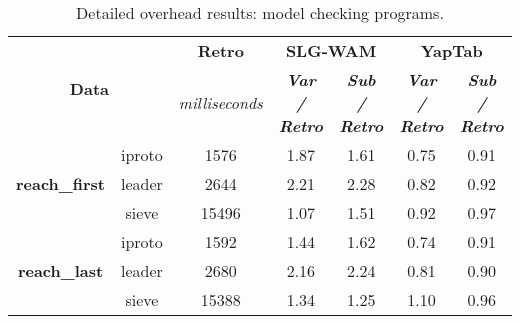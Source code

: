 \begin{table}[ht]
\centering
\footnotesize{
  \begin{tabular}{cc|c|cc|cc}
   \hline
    \hline
    \multicolumn{2}{c|}{\multirow{2}{*}{\small{\textbf{Data}}}} & \textbf{\small{Retro}} & \multicolumn{2}{c|}{\small{\textbf{SLG-WAM}}} & \multicolumn{2}{c}{\small{\textbf{YapTab}}} \\
     \multicolumn{2}{c|}{} & \scriptsize{\textit{milliseconds}} & \textbf{\textit{\scriptsize{Var / Retro}}} & \textbf{\textit{\scriptsize{Sub / Retro}}} & \textbf{\textit{\scriptsize{Var / Retro}}} & \textbf{\textit{\scriptsize{Sub / Retro}}} \\
   \hline
   \hline

\multirow{3}{*}{\textbf{reach\_first}} &  iproto &  1576 &  1.87  &  1.61  &  0.75 & 0.91 \\
&  leader &  2644 &  2.21  &  2.28  &  0.82 & 0.92 \\
&  sieve &  15496 &  1.07  &  1.51  &  0.92 & 0.97 \\
\hline
\multirow{3}{*}{\textbf{reach\_last}} &  iproto &  1592 &  1.44  &  1.62  &  0.74 & 0.91 \\
&  leader &  2680 &  2.16  &  2.24  &  0.81 & 0.90 \\
&  sieve &  15388 &  1.34  &  1.25  &  1.10 & 0.96 \\
\hline
\hline
\end{tabular}
}
\caption{Detailed overhead results: model checking programs.}
\label{tbl:overhead_detail_model}
\end{table}